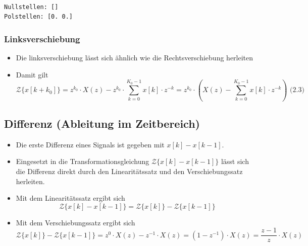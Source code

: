 \documentclass[11pt]{article}
\providecommand{\tightlist}{%
      \setlength{\itemsep}{0pt}\setlength{\parskip}{0pt}}
\begin{document}
    \begin{center}
    \end{center}
    { \hspace*{\fill} \\}
    
    \begin{Verbatim}[commandchars=\\\{\}]
Nullstellen: []
Polstellen: [0. 0.]

    \end{Verbatim}

    \subsubsection{Linksverschiebung}\label{linksverschiebung}

\begin{itemize}
\item
  Die linksverschiebung lässt sich ähnlich wie die Rechtsverschiebung
  herleiten
\item
  Damit gilt
  \[\mathcal{Z}\{x[k+k_0]\} = z^{k_0} \cdot X(z) - z^{k_0} \cdot \sum_{k=0}^{K_0-1}x[k] \cdot z^{-k} = z^{k_0} \cdot (X(z) - \sum_{k=0}^{K_0-1}x[k] \cdot z^{-k})\textrm{  (2.3)}\]
\end{itemize}

    \subsection{Differenz (Ableitung im
Zeitbereich)}\label{differenz-ableitung-im-zeitbereich}

\begin{itemize}
\item
  Die erste Differenz eines Signals ist gegeben mit \(x[k] - x[k-1]\).
\item
  Eingesetzt in die Transformationsgleichung
  \(\mathcal{Z}\{x[k] - x[k-1]\}\) lässt sich die Differenz direkt durch
  den Linearitätssatz und den Verschiebungssatz herleiten.
\end{itemize}

    \begin{itemize}
\tightlist
\item
  Mit dem Linearitätssatz ergibt sich
  \[\mathcal{Z}\{x[k] - x[k-1]\} = \mathcal{Z}\{x[k]\} - \mathcal{Z}\{x[k-1]\}\]
\end{itemize}

    \begin{itemize}
\tightlist
\item
  Mit dem Verschiebungssatz ergibt sich
  \[\mathcal{Z}\{x[k]\} - \mathcal{Z}\{x[k-1]\} = z^0 \cdot X(z) - z^{-1} \cdot X(z) = (1-z^{-1}) \cdot X(z) = \frac{z-1}{z} \cdot X(z)\]
\end{itemize}
\end{document}
